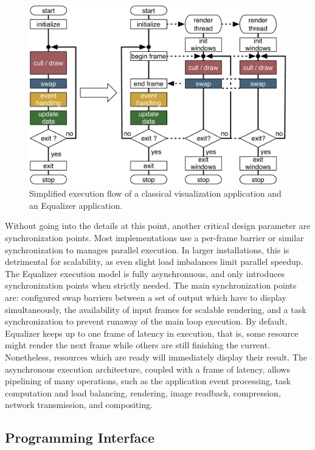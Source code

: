 \begin{figure}[ht]\center
  \includegraphics[width=.9\columnwidth]{images/executionFlow}
  \caption{Simplified execution flow of a classical visualization application
    and an Equalizer application.}
  \label{FIG_execution}
\end{figure}

Without going into the details at this point, another critical design parameter
are synchronization points. Most implementations use a per-frame barrier or
similar synchronization to manages parallel execution. In larger installations,
this is detrimental for scalability, as even slight load imbalances limit
parallel speedup. The Equalizer execution model is fully asynchronuous, and only
introduces synchronization points when strictly needed. The main synchronization
points are: configured swap barriers between a set of output which have to
display simultaneously, the availability of input frames for scalable rendering,
and a task synchronization to prevent runaway of the main loop execution. By
default, Equalizer keeps up to one frame of latency in execution, that is, some
resource might render the next frame while others are still finishing the
current. Nonetheless, resources which are ready will immediately display their
result. The asynchronous execution architecture, coupled with a frame of
latency, allows pipelining of many operations, such as the application event
processing, task computation and load balancing, rendering, image readback,
compression, network transmission, and compositing.


\subsection{Programming Interface}

